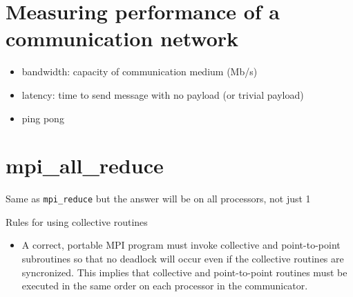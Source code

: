 \documentclass[10pt]{article}
\newenvironment{mitemize}
{
  \begin{itemize}
  \setlength{\itemsep}{1pt}
  \setlength{\parskip}{0pt}
  \setlength{\parsep}{0pt}}{\end{itemize}
}
\begin{document}
\section*{Measuring performance of a communication network}
\begin{mitemize}
  \item bandwidth: capacity of communication medium (Mb/s)
  \item latency: time to send message with no payload (or trivial payload)
  \item ping pong
\end{mitemize}

\section*{mpi\_all\_reduce}
Same as \texttt{mpi\_reduce} but the answer will be on all processors, not just 1

Rules for using collective routines
\begin{mitemize}
  \item A correct, portable MPI program must invoke collective and point-to-point
        subroutines so that no deadlock will occur even if the collective routines are
        syncronized. This implies that collective and point-to-point routines must be
        executed in the same order on each processor in the communicator.
\end{mitemize}
\end{document}
